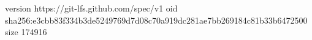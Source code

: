 version https://git-lfs.github.com/spec/v1
oid sha256:e3cbb83f334b3de5249769d7d08c70a919dc281ae7bb269184c81b33b6472500
size 174916

